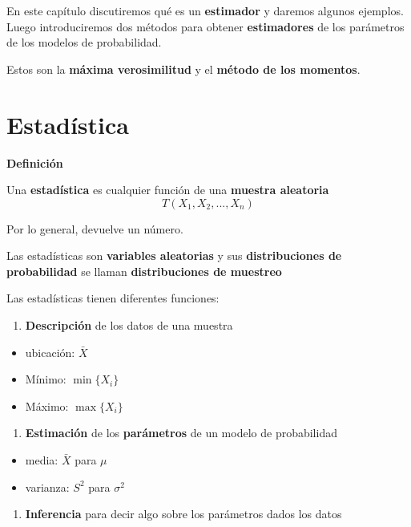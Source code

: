 \documentclass[
]{book}
\providecommand{\tightlist}{%
  \setlength{\itemsep}{0pt}\setlength{\parskip}{0pt}}
\begin{document}
En este capítulo discutiremos qué es un \textbf{estimador} y daremos algunos ejemplos. Luego introduciremos dos métodos para obtener \textbf{estimadores} de los parámetros de los modelos de probabilidad.

Estos son la \textbf{máxima verosimilitud} y el \textbf{método de los momentos}.

\hypertarget{estaduxedstica-1}{%
\section{Estadística}\label{estaduxedstica-1}}

\textbf{Definición}

Una \textbf{estadística} es cualquier función de una \textbf{muestra aleatoria}
\[T(X_1,X_2, ..., X_n)\]

Por lo general, devuelve un número.

Las estadísticas son \textbf{variables aleatorias} y sus \textbf{distribuciones de probabilidad} se llaman \textbf{distribuciones de muestreo}

Las estadísticas tienen diferentes funciones:

\begin{enumerate}
\def\labelenumi{\arabic{enumi}.}
\tightlist
\item
  \textbf{Descripción} de los datos de una muestra
\end{enumerate}

\begin{itemize}
\tightlist
\item
  ubicación: \(\bar{X}\)
\item
  Mínimo: \(\min\{X_i\}\)
\item
  Máximo: \(\max\{X_i\}\)
\end{itemize}

\begin{enumerate}
\def\labelenumi{\arabic{enumi}.}
\setcounter{enumi}{1}
\tightlist
\item
  \textbf{Estimación} de los \textbf{parámetros} de un modelo de probabilidad
\end{enumerate}

\begin{itemize}
\tightlist
\item
  media: \(\bar{X}\) para \(\mu\)
\item
  varianza: \(S^2\) para \(\sigma^2\)
\end{itemize}

\begin{enumerate}
\def\labelenumi{\arabic{enumi}.}
\setcounter{enumi}{2}
\tightlist
\item
  \textbf{Inferencia} para decir algo sobre los parámetros dados los datos
\end{enumerate}
\end{document}
